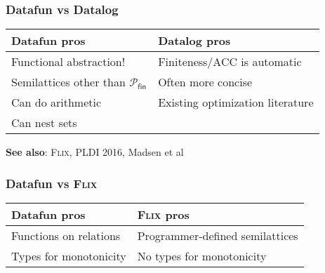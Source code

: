 \documentclass{beamer}
\newcommand{\ms}{\mathsf}
\begin{document}

\begin{frame}
  \frametitle{Datafun vs Datalog}

  \begin{center}
    \begin{tabular}{l|l}
      \textbf{Datafun pros} & \textbf{Datalog pros}\\\hline
      Functional abstraction! & Finiteness/ACC is automatic\\
      Semilattices other than $\mathcal{P}_{\ms{fin}}$ & Often more concise\\
      Can do arithmetic & Existing optimization literature\\
      Can nest sets
    \end{tabular}
  \end{center}

  \vspace{2em}

  \textbf{See also}: \textsc{Flix}, PLDI 2016, Madsen et al
\end{frame}

\begin{frame}
  \frametitle{Datafun vs \textsc{Flix}}

  \begin{center}
    \begin{tabular}{l|l}
      \textbf{Datafun pros} & \textsc{Flix}\textbf{ pros}\\\hline
      Functions on relations & Programmer-defined semilattices\\
      Types for monotonicity & No types for monotonicity
    \end{tabular}
  \end{center}
\end{frame}
\end{document}
